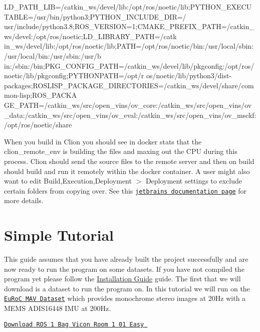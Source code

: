 \begin{DoxyCode}

      LD\_PATH\_LIB=/catkin\_ws/devel/lib:/opt/ros/noetic/lib;PYTHON\_EXECUTABLE=/usr/bin/python3;PYTHON\_INCLUDE\_DIR=/
      usr/include/python3.8;ROS\_VERSION=1;CMAKE\_PREFIX\_PATH=/catkin\_ws/devel:/opt/ros/noetic;LD\_LIBRARY\_PATH=/catk
      in\_ws/devel/lib:/opt/ros/noetic/lib;PATH=/opt/ros/noetic/bin:/usr/local/sbin:/usr/local/bin:/usr/sbin:/usr/b
      in:/sbin:/bin;PKG\_CONFIG\_PATH=/catkin\_ws/devel/lib/pkgconfig:/opt/ros/noetic/lib/pkgconfig;PYTHONPATH=/opt/r
      os/noetic/lib/python3/dist-packages;ROSLISP\_PACKAGE\_DIRECTORIES=/catkin\_ws/devel/share/common-lisp;ROS\_PACKA
      GE\_PATH=/catkin\_ws/src/open\_vins/ov\_core:/catkin\_ws/src/open\_vins/ov\_data:/catkin\_ws/src/open\_vins/ov\_eval:/catkin\_ws/src/open\_vins/ov\_msckf:/opt/ros/noetic/share
\end{DoxyCode}


When you build in Clion you should see in {\ttfamily docker stats} that the {\ttfamily clion\+\_\+remote\+\_\+env} is building the files and maxing out the C\+PU during this process. Clion should send the source files to the remote server and then on build should build and run it remotely within the docker container. A user might also want to edit {\ttfamily Build,Execution,Deployment $>$ Deployment} settings to exclude certain folders from copying over. See this \href{https://www.jetbrains.com/help/clion/remote-projects-support.html}{\tt jetbrains documentation page} for more details. \hypertarget{gs-tutorial}{}\section{Simple Tutorial}\label{gs-tutorial}
This guide assumes that you have already built the project successfully and are now ready to run the program on some datasets. If you have not compiled the program yet please follow the \hyperlink{gs-installing}{Installation Guide} guide. The first that we will download is a dataset to run the program on. In this tutorial we will run on the \href{https://projects.asl.ethz.ch/datasets/doku.php?id=kmavvisualinertialdatasets}{\tt Eu\+RoC M\+AV Dataset} \cite{Burri2016IJRR} which provides monochrome stereo images at 20\+Hz with a M\+E\+MS A\+D\+I\+S16448 I\+MU at 200\+Hz.

 \href{http://robotics.ethz.ch/~asl-datasets/ijrr_euroc_mav_dataset/vicon_room1/V1_01_easy/V1_01_easy.bag}{\tt Download R\+OS 1 Bag Vicon Room 1 01 Easy  } 

